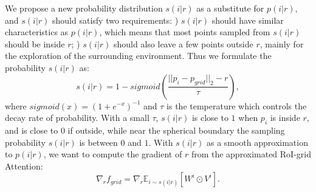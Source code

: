 \documentclass[10pt,twocolumn,letterpaper]{article}
\begin{document}
We propose a new probability distribution $s(i|r)$ as a substitute for $p(i|r)$, and $s(i|r)$ should satisfy two requirements: ) $s(i|r)$ should have similar characteristics as $p(i|r)$, which means that most points sampled from $s(i|r)$ should be inside $r$; ) $s(i|r)$ should also leave a few points outside $r$, mainly for the exploration of the surrounding environment. Thus we formulate the probability $s(i|r)$ as:
\begin{equation} \label{3.2.3}
    s(i|r) = 1 - sigmoid(\frac{||p_{i} - p_{grid}||_{2} - r}{\tau}),
\end{equation}
where $sigmoid(x) = (1 + e^{-x})^{-1}$ and $\tau$ is the temperature which controls the decay rate of probability. With a small $\tau$, $s(i|r)$ is close to $1$ when $p_{i}$ is inside $r$, and is close to $0$ if outside, while near the spherical boundary the sampling probability $s(i|r)$ is between $0$ and $1$. With $s(i|r)$ as a smooth approximation to $p(i|r)$, we want to compute the gradient of $r$ from the approximated RoI-grid Attention:
\begin{equation} \label{3.2.4}
    \nabla_{r} f_{grid} = \nabla_{r} \mathbb{E}_{i \sim s(i|r)}[W^{i} \odot V^{i}].
\end{equation}
\end{document}
